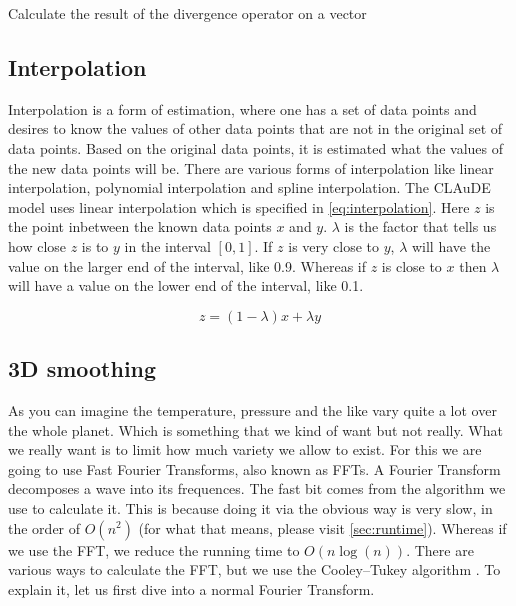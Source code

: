 \begin{algorithm}[!hbt]
    \caption{Calculate the result of the divergence operator on a vector}
    \label{alg:divergence}
     \;  
\end{algorithm}

\subsection{Interpolation} \label{sec:interpolation}
Interpolation is a form of estimation, where one has a set of data points and desires to know the values of other data points that are not in the original set of data points\cite{interpolation}. 
Based on the original data points, it is estimated what the values of the new data points will be. There are various forms of interpolation like linear interpolation, polynomial interpolation 
and spline interpolation. The CLAuDE model uses linear interpolation which is specified in \autoref{eq:interpolation}. Here $z$ is the point inbetween the known data points $x$ and $y$. 
$\lambda$ is the factor that tells us how close $z$ is to $y$ in the interval $[0, 1]$. If $z$ is very close to $y$, $\lambda$ will have the value on the larger end of the interval, like 0.9.
Whereas if $z$ is close to $x$ then $\lambda$ will have a value on the lower end of the interval, like 0.1.

\begin{equation}
    \label{eq:interpolation}
    z = (1 - \lambda)x + \lambda y
\end{equation}

\subsection{3D smoothing} \label{sec:3dsmooth}
As you can imagine the temperature, pressure and the like vary quite a lot over the whole planet. Which is something that we kind of want but not really. What we really want is to limit how 
much variety we allow to exist. For this we are going to use Fast Fourier Transforms, also known as FFTs. A Fourier Transform decomposes a wave into its frequences. The fast bit comes from the 
algorithm we use to calculate it. This is because doing it via the obvious way is very slow, in the order of $O(n^2)$ (for what that means, please visit \autoref{sec:runtime}). Whereas if we use 
the FFT, we reduce the running time to $O(n\log(n))$. There are various ways to calculate the FFT, but we use the Cooley–Tukey algorithm \cite{fft}. To explain it, let us first dive into a normal 
Fourier Transform.

